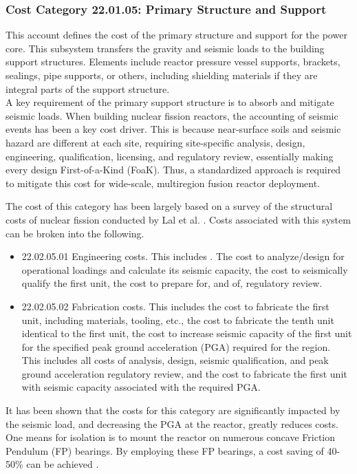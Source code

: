 \subsubsection*{Cost Category 22.01.05:  Primary Structure and Support}
\label{sec:22.1.5}
This account defines the cost of the primary structure and support for the power core. This subsystem  transfers the gravity and seismic loads to the building support structures. Elements include reactor pressure vessel supports, brackets, sealings, pipe supports, or others, including shielding materials if they are integral parts of the support structure. \\

A key requirement of the primary support structure is to absorb and mitigate seismic loads. When building nuclear fission reactors, the accounting of seismic events has been a key cost driver. This is because near-surface soils and seismic hazard are different at each site, requiring site-specific analysis, design, engineering, qualification, licensing, and regulatory review, essentially making every design First-of-a-Kind (FoaK). Thus, a standardized approach is required to mitigate this cost for wide-scale, multiregion fusion reactor deployment. 

The cost of this category has been largely based on a survey of the structural costs of nuclear fission conducted by Lal et al. \cite{lal2022towards}. Costs associated with this system can be broken into the following. 
\begin{itemize}
    \item 22.02.05.01 Engineering costs. This includes . The cost to analyze/design for operational loadings and calculate its seismic capacity, the cost to seismically qualify the first unit, the cost to prepare for, and of, regulatory review.
    \item 22.02.05.02 Fabrication costs. This includes the cost to fabricate the first unit, including materials, tooling, etc., the cost to fabricate the tenth unit identical to the first unit, the cost to increase seismic capacity of the first unit for the specified peak ground acceleration (PGA) required for the region. This includes all costs of analysis, design, seismic qualification, and peak ground acceleration regulatory review, and the cost to fabricate the first unit with seismic capacity associated with the required PGA. 
\end{itemize}

It has been shown \cite{lal2022towards} that the costs for this category are significantly impacted by the seismic load, and decreasing the PGA at the reactor, greatly reduces costs. One means for isolation is to mount the reactor on numerous concave Friction Pendulum (FP) bearings. By employing these FP bearings, a cost saving of 40-50\% can be achieved \cite{lal2022towards}.


